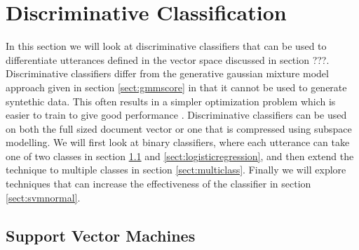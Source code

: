 \chapter{Discriminative Classification}
\label{sect:classify}

In this section we will look at discriminative classifiers that can be used to differentiate utterances defined in the vector space discussed in section ???. Discriminative classifiers differ from the generative gaussian mixture model approach given in section \ref{sect:gmmscore} in that it cannot be used to generate syntethic data. This often results in a simpler optimization problem which is easier to train to give good performance \cite[p. 204]{machinelearningbook}. Discriminative classifiers can be used on both the full sized document vector or one that is compressed using subspace modelling. We will first look at binary classifiers, where each utterance can take one of two classes in section \ref{sect:svm} and \ref{sect:logisticregression}, and then extend the technique to multiple classes in section \ref{sect:multiclass}. Finally we will explore techniques that can increase the effectiveness of the classifier in section \ref{sect:svmnormal}.

\section{Support Vector Machines}
\label{sect:svm}

